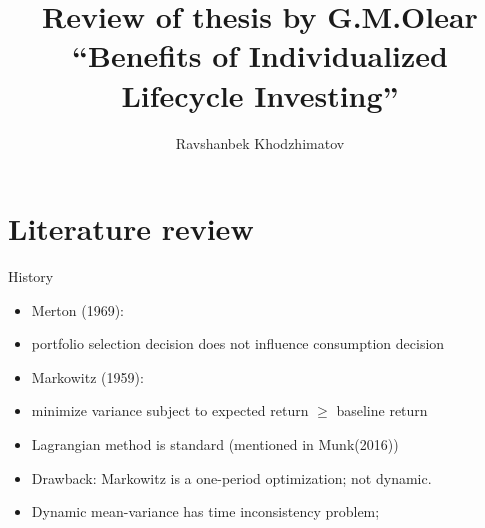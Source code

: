 \documentclass{beamer}
\author{Ravshanbek Khodzhimatov}
\title{Review of thesis by G.M.Olear ``Benefits of Individualized Lifecycle Investing''}
\begin{document}
\begin{frame}
\titlepage
\end{frame}
\section{Literature review}

\begin{frame}[allowframebreaks]{History}
  \begin{itemize}
    \item Merton (1969):
    \item portfolio selection decision does not influence consumption decision
    \item Markowitz (1959):
    \item minimize variance subject to expected return $\geq$ baseline return
    \item Lagrangian method is standard (mentioned in Munk(2016))
    \item Drawback: Markowitz is a one-period optimization; not dynamic.
    \item Dynamic mean-variance has time inconsistency problem;
  \end{itemize}
\end{frame}
\end{document}
